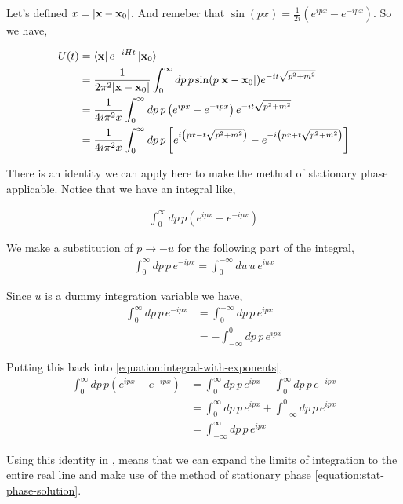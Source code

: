 Let's defined $x = \left| \boldsymbol{\mathbf{x}}-\boldsymbol{\mathbf{x}}_0 \right|$.
And remeber that $\sin\left(px\right) = \frac{1}{2i} \left(e^{ipx} - e^{-ipx}\right)$.
So we have,

\begin{align}
U(t) &= \bra{\boldsymbol{\mathbf{x}}} e^{-iHt} \ket{\boldsymbol{\mathbf{x}}_0} \\
&= \frac{1}{2\pi^2 |\boldsymbol{\mathbf{x}}-\boldsymbol{\mathbf{x}}_0|}
    \int_{0}^{\infty} dp \, p \sin(p|\boldsymbol{\mathbf{x}}-\boldsymbol{\mathbf{x}}_0|) e^{-it\sqrt{p^2 + m^2}}  \\
&= \frac{1}{4i \pi^2 x}
    \int_{0}^{\infty} dp \, p \left(e^{ipx} - e^{-ipx}\right) e^{-it\sqrt{p^2 + m^2}} \\
&= \frac{1}{4i \pi^2 x}
    \int_{0}^{\infty} dp \, p
    \left[ e^{i \left(px - t\sqrt{p^2 + m^2}\right)} - e^{-i \left(px + t\sqrt{p^2 + m^2}\right)} \right]
\end{align}

There is an identity we can apply here to make the method of stationary phase applicable.
Notice that we have an integral like,

\begin{align} \label{equation:integral-with-exponents}
\int_{0}^{\infty} dp \, p \left( e^{ipx} - e^{-ipx} \right)
\end{align}

We make a substitution of $p \rightarrow -u$ for the following part of the integral,
\begin{align*}
\int_{0}^{\infty} dp \, p \, e^{-ipx} = \int_{0}^{-\infty} du \, u \, e^{iux}
\end{align*}

Since $u$ is a dummy integration variable we have,
\begin{align*}
\int_{0}^{\infty} dp \, p \, e^{-ipx} &= \int_{0}^{-\infty} dp \, p \, e^{ipx} \\
&= - \int^{0}_{-\infty} dp \, p \, e^{ipx}
\end{align*}

Putting this back into \ref{equation:integral-with-exponents},
\begin{align*}
\int_{0}^{\infty} dp \, p \left( e^{ipx} - e^{-ipx} \right) &=
    \int_{0}^{\infty} dp \, p \, e^{ipx} - \int_{0}^{\infty} dp \, p \, e^{-ipx} \\
&= \int_{0}^{\infty} dp \, p \, e^{ipx} + \int^{0}_{-\infty} dp \, p \, e^{ipx} \\
&= \int_{-\infty}^{\infty} dp \, p \, e^{ipx}
\end{align*}


Using this identity in \cite{peskin-and-schroeder},
means that we can expand the limits of integration to the entire real line and make use of the method of stationary
phase \ref{equation:stat-phase-solution}.


